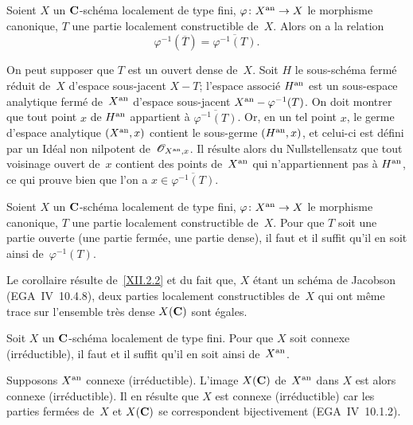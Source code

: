 \begin{proposition}
\label{XII.2.2}
Soient $X$ un $\mathbf{C}$-sch\'ema localement de type fini,
$\varphi\colon X^{\an}\to X$ le morphisme canonique, $T$ une partie
localement constructible de~$X$. Alors on a la relation
$$
\varphi^{-1}(\overline{T})=\overline{\varphi^{-1}(T)}.
$$
\end{proposition}

On peut supposer que $T$ est un ouvert dense de~$X$. Soit $H$ le
sous-sch\'ema ferm\'e r\'eduit de~$X$ d'espace sous-jacent
$X-T$; l'espace associ\'e $H^{\mathrm{an}}$ est un sous-espace analytique
ferm\'e de~$X^{\mathrm{an}}$ d'espace sous-jacent
$X^{\mathrm{an}}-\varphi^{-1}(T)$. On doit montrer que tout point $x$ de
$H^{\mathrm{an}}$ appartient \`a $\overline{\varphi^{-1}(T)}$. Or, en un tel
point $x$, le germe d'espace analytique $(X^{\mathrm{an}},x)$ contient le
sous-germe $(H^{\mathrm{an}},x)$, et celui-ci est d\'efini par un Id\'eal
non nilpotent de~$\cal{O}_{X^{\an},x}$. Il r\'esulte alors du
Nullstellensatz \cite[~\S 4~cor.\, 3]{XII.4} que tout voisinage ouvert de~$x$
contient des points de~$X^{\mathrm{an}}$ qui n'appartiennent pas \`a
$H^{\mathrm{an}}$, ce qui prouve bien que l'on a
$x\in\overline{\varphi^{-1}(T)}$.

\begin{corollaire}
\label{XII.2.3}
Soient
$X$ un $\mathbf{C}$-sch\'ema localement de type fini, $\varphi
\colon X^\an \to X$ le morphisme canonique, $T$ une partie localement
constructible de~$X$. Pour que $T$ soit une partie ouverte (\resp une
partie ferm\'ee, \resp une partie dense), il faut et il suffit qu'il
en soit ainsi de~$\varphi^{-1} (T)$.
\end{corollaire}

Le corollaire r\'esulte de~\ref{XII.2.2} et du fait que, $X$
\'etant un sch\'ema de Jacobson (EGA~IV~10.4.8), deux parties
localement constructibles de~$X$ qui ont m\^eme trace sur l'ensemble
tr\`es dense $X (\mathbf{C} )$ sont \'egales.

\begin{proposition}
\label{XII.2.4} Soit $X$ un $\mathbf{C}$-sch\'ema localement de type
fini. Pour que $X$ soit connexe (\resp irr\'eductible), il faut et
il suffit qu'il en soit ainsi de~$X^{\mathrm{an}}$.
\end{proposition}

Supposons $X^{\mathrm{an}} $ connexe (\resp irr\'eductible). L'image $X (\mathbf{C})
$ de~$X^{\mathrm{an}}$ dans $X$ est alors connexe (\resp irr\'eductible). Il
en r\'esulte que $X$ est connexe (\resp irr\'eductible) car les
parties ferm\'ees de~$X$ et $X (\mathbf{C})$ se correspondent bijectivement
(EGA~IV~10.1.2).

